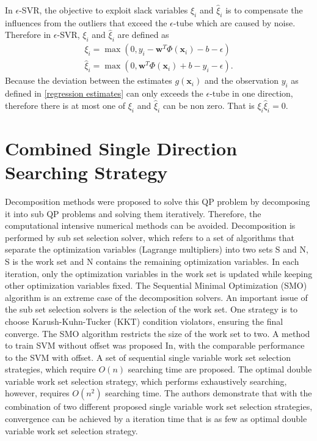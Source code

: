 In $\epsilon$-SVR, the objective to exploit slack variables $\xi_{i}$ and $\hat{\xi}_{i}$ is to compensate the influences from the outliers that exceed the $\epsilon$-tube which are caused by noise.
Therefore in $\epsilon$-SVR, $\xi_{i}$ and $\hat{\xi}_{i}$ are defined as  
\begin{eqnarray}
\label{definition of slack variable1}
\xi_{i}=\max(0, y_{i}-\mathbf{w}^{T}\Phi(\mathbf{x}_{i})-b-\epsilon)\\
\label{definition of slack variable2}
\hat{\xi}_{i}=\max(0, \mathbf{w}^{T}\Phi(\mathbf{x}_{i})+b-y_{i}-\epsilon).
\end{eqnarray} 
Because the deviation between the estimates $g(\mathbf{x}_{i})$ and the observation $y_{i}$ as defined in \ref{regression estimates} can only exceeds the $\epsilon$-tube in one direction, therefore there is at most one of $\xi_{i}$ and $\hat{\xi}_{i}$ can be non zero. That is $\xi_{i}\hat{\xi}_{i}=0$.





\section{Combined Single Direction Searching Strategy}
Decomposition methods were proposed to solve this QP problem by decomposing it into sub QP problems and solving them iteratively\cite{platt1999fast}. Therefore, the computational intensive numerical methods can be avoided. Decomposition is performed by sub set selection solver, which refers to a set of algorithms that separate the optimization variables (Lagrange multipliers) into two sets S and N, S is the work set and N contains the remaining optimization variables. In each iteration, only the optimization variables in the work set is updated while keeping other optimization variables fixed. The Sequential Minimal Optimization (SMO) algorithm\cite{platt1999fast} is an extreme case of the decomposition solvers. An important issue of the sub set selection solvers is the selection of the work set. One strategy is to choose Karush-Kuhn-Tucker (KKT) condition violators, ensuring the final converge\cite{osuna1997improved}. The SMO algorithm restricts the size of the work set to two. A method to train SVM without offset was proposed In\cite{steinwart2011training}, with the comparable performance to the SVM with offset. A set of sequential single variable work set selection strategies, which require $O(n)$ searching time are proposed. The optimal double variable work set selection strategy, which performs exhaustively searching, however, requires $O(n^{2})$ searching time. The authors demonstrate that with the combination of two different proposed single variable work set selection strategies, convergence can be achieved by a iteration time that is as few as optimal double variable work set selection strategy.


